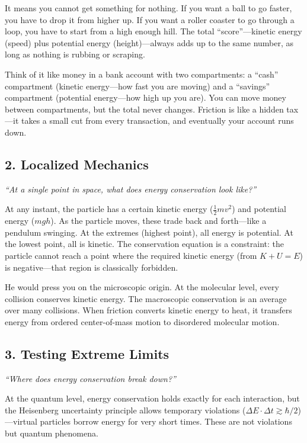 It means you cannot get something for nothing. If you want a ball to go faster, you have to drop it from higher up. If you want a roller coaster to go through a loop, you have to start from a high enough hill. The total ``score''---kinetic energy (speed) plus potential energy (height)---always adds up to the same number, as long as nothing is rubbing or scraping.

Think of it like money in a bank account with two compartments: a ``cash'' compartment (kinetic energy---how fast you are moving) and a ``savings'' compartment (potential energy---how high up you are). You can move money between compartments, but the total never changes. Friction is like a hidden tax---it takes a small cut from every transaction, and eventually your account runs down.

\subsection*{2. Localized Mechanics}
\textit{``At a single point in space, what does energy conservation look like?''}

At any instant, the particle has a certain kinetic energy ($\frac{1}{2}mv^2$) and potential energy ($mgh$). As the particle moves, these trade back and forth---like a pendulum swinging. At the extremes (highest point), all energy is potential. At the lowest point, all is kinetic. The conservation equation is a constraint: the particle cannot reach a point where the required kinetic energy (from $K + U = E$) is negative---that region is classically forbidden.

He would press you on the microscopic origin. At the molecular level, every collision conserves kinetic energy. The macroscopic conservation is an average over many collisions. When friction converts kinetic energy to heat, it transfers energy from ordered center-of-mass motion to disordered molecular motion.

\subsection*{3. Testing Extreme Limits}
\textit{``Where does energy conservation break down?''}

At the quantum level, energy conservation holds exactly for each interaction, but the Heisenberg uncertainty principle allows temporary violations ($\Delta E \cdot \Delta t \gtrsim \hbar/2$)---virtual particles borrow energy for very short times. These are not violations but quantum phenomena.

